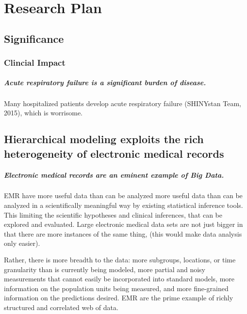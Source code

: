 \documentclass[]{article}
\title{}
\author{}
\date{}
\begin{document}
\maketitle


\section{Research Plan}\label{research-plan}

\subsection{Significance}\label{significance}

\subsubsection{Clincial Impact}\label{clincial-impact}

\subparagraph{Acute respiratory failure is a significant burden of
disease.}\label{acute-respiratory-failure-is-a-significant-burden-of-disease.}

Many hospitalized patients develop acute respiratory failure (SHINYstan
Team, 2015), which is worrisome.

\subsection{Hierarchical modeling exploits the rich heterogeneity of
electronic medical
records}\label{hierarchical-modeling-exploits-the-rich-heterogeneity-of-electronic-medical-records}

\subparagraph{Electronic medical records are an eminent example of Big
Data.}\label{electronic-medical-records-are-an-eminent-example-of-big-data.}

EMR have more useful data than can be analyzed more useful data than can
be analyzed in a scientifically meaningful way by existing statistical
inference tools. This limiting the scientific hypotheses and clinical
inferences, that can be explored and evaluated. Large electronic medical
data sets are not just bigger in that there are more instances of the
same thing, (this would make data analysis only easier). 

Rather, there is more breadth to the data: more subgroups, locations, or time
granularity than is currently being modeled, more partial and noisy
measurements that cannot easily be incorporated into standard models,
more information on the population units being measured, and more
fine-grained information on the predictions desired. EMR are the prime
example of richly structured and correlated web of data.
\end{document}
